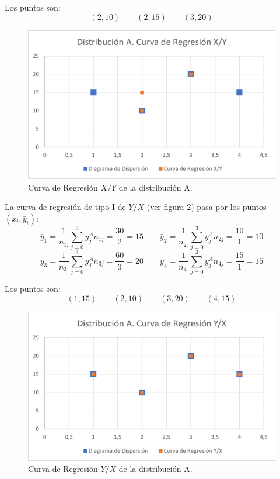 \begin{ejercicio}
\begin{enumerate}
\begin{enumerate}
            Los puntos son:
            \begin{equation*}
                (2,10)\qquad (2,15) \qquad (3,20)
            \end{equation*}
            \begin{figure}[H]
                \centering
                \includegraphics[width=0.6\linewidth]{Imagenes/Ej7.2.A.1.png}
                \caption{Curva de Regresión $X/Y$ de la distribución A.}
                \label{fig:Ej7.2.A.1}
            \end{figure}
            

            La curva de regresión de tipo I de $Y/X$ (ver figura \ref{fig:Ej7.2.A.2}) pasa por los puntos $(x_i, \bar{y}_i)$:
            \begin{equation*}
                \bar{y}_1 = \frac{1}{n_{1.}}\sum_{j=0}^3 y_j^A n_{1j} = \frac{30}{2} = 15
                \qquad
                \bar{y}_2 = \frac{1}{n_{2.}}\sum_{j=0}^3 y_j^A n_{2j} = \frac{10}{1} = 10
            \end{equation*}
            \begin{equation*}
                \bar{y}_3 = \frac{1}{n_{3.}}\sum_{j=0}^3 y_j^A n_{3j} = \frac{60}{3} = 20
                \qquad
                \bar{y}_4 = \frac{1}{n_{4.}}\sum_{j=0}^3 y_j^A n_{4j} = \frac{15}{1} = 15
            \end{equation*}

            Los puntos son:
            \begin{equation*}
                (1,15)\qquad (2,10) \qquad (3,20) \qquad (4,15)
            \end{equation*}
            \begin{figure}[H]
                \centering
                \includegraphics[width=0.6\linewidth]{Imagenes/Ej7.2.A.2.png}
                \caption{Curva de Regresión $Y/X$ de la distribución A.}
                \label{fig:Ej7.2.A.2}
            \end{figure}
            

\end{enumerate}
\end{enumerate}
\end{ejercicio}
